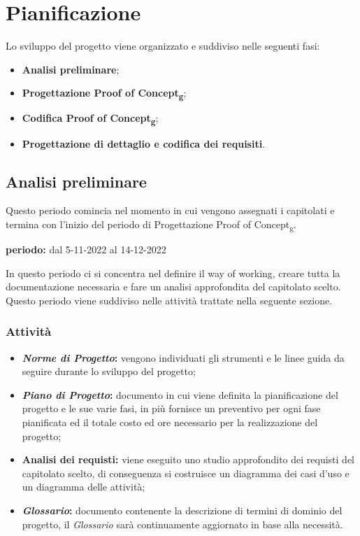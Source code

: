 \section{Pianificazione}
Lo sviluppo del progetto viene organizzato e suddiviso nelle seguenti fasi:
\begin{itemize}
\item \textbf{Analisi preliminare};
\item \textbf{Progettazione Proof of Concept\textsubscript{g}};
\item \textbf{Codifica Proof of Concept\textsubscript{g}};
\item \textbf{Progettazione di dettaglio e codifica dei requisiti}.
\end{itemize}


\subsection{Analisi preliminare}
Questo periodo comincia nel momento in cui vengono assegnati i capitolati e termina con l'inizio del periodo di Progettazione Proof of Concept\textsubscript{g}.\\
\begin{center}
\textbf{periodo:} dal 5-11-2022 al 14-12-2022\\
\end{center}
In questo periodo ci si concentra nel definire il way of working, creare tutta la documentazione necessaria e fare un analisi approfondita del capitolato scelto.  Questo periodo viene suddiviso nelle attività trattate nella seguente sezione.

\subsubsection{Attività}
\begin{itemize}
\item \textbf{\textit{Norme di Progetto}:} vengono individuati gli strumenti e le linee guida da seguire durante lo sviluppo del progetto;
\item \textbf{\textit{Piano di Progetto}:} documento in cui viene definita la pianificazione del progetto e le sue varie fasi,  in più fornisce un preventivo per ogni fase pianificata ed il totale costo ed ore necessario per la realizzazione del progetto;
\item \textbf{Analisi dei requisti:} viene eseguito uno studio approfondito dei requisti del capitolato scelto,  di conseguenza si costruisce un diagramma dei casi d'uso e un diagramma delle attività;
\item \textbf{\textit{Glossario}: } documento contenente la descrizione di termini di dominio del progetto, il \textit{Glossario} sarà continuamente aggiornato in base alla necessità.
\end{itemize}

